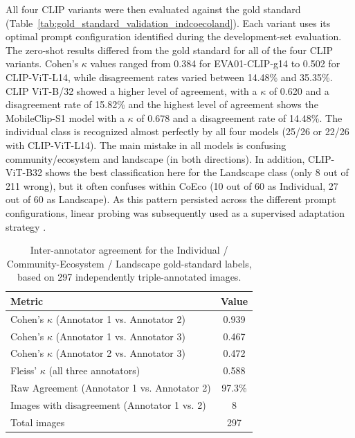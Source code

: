 \documentclass[11pt]{article}
\renewcommand{\_}{\textunderscore\allowbreak{}}
\begin{document}
All four CLIP variants were then evaluated against the gold standard (Table~\ref{tab:gold_standard_validation_indcoecoland}). Each variant uses its optimal prompt configuration identified during the development-set evaluation. The zero-shot results differed from the gold standard for all of the four CLIP variants. Cohen's $\kappa$ values ranged from 0.384 for EVA01-CLIP-g14 to 0.502 for CLIP-ViT-L14, while disagreement rates varied between 14.48\% and 35.35\%. CLIP ViT-B/32 showed a higher level of agreement, with a $\kappa$ of 0.620 and a disagreement rate of 15.82\% and the highest level of agreement shows the MobileClip-S1 model with a $\kappa$ of 0.678 and a disagreement rate of 14.48\%. The individual class is recognized almost perfectly by all four models (25/26 or 22/26 with CLIP-ViT-L14). The main mistake in all models is confusing community/ecosystem and landscape (in both directions). In addition, CLIP-ViT-B32 shows the best classification here for the Landscape class (only 8 out of 211 wrong), but it often confuses within CoEco (10 out of 60 as Individual, 27 out of 60 as Landscape). As this pattern persisted across the different prompt configurations, linear probing was subsequently used as a supervised adaptation strategy \citep{radford_learning_2021}.


\begin{table}[htbp]
\centering
\caption{Inter-annotator agreement for the Individual / Community-Ecosystem / Landscape gold-standard labels, based on 297 independently triple-annotated images.}
\label{tab:interannotator_indcoecoland}
\begin{tabular}{@{}lc@{}}
\toprule
\textbf{Metric} & \textbf{Value} \\
\midrule
Cohen's $\kappa$ (Annotator 1 vs. Annotator 2) & 0.939 \\
Cohen's $\kappa$ (Annotator 1 vs. Annotator 3) & 0.467 \\
Cohen's $\kappa$ (Annotator 2 vs. Annotator 3) & 0.472 \\
Fleiss' $\kappa$ (all three annotators)          & 0.588 \\
Raw Agreement (Annotator 1 vs. Annotator 2)     & 97.3\% \\
Images with disagreement (Annotator 1 vs. 2)    & 8 \\
Total images                                     & 297 \\
\bottomrule
\end{tabular}
\end{table}
\end{document}
